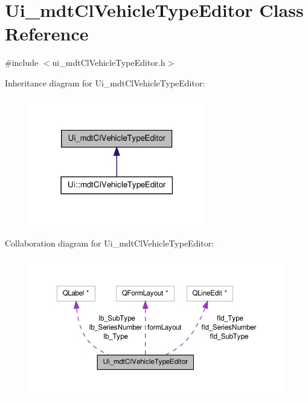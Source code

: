 \hypertarget{class_ui__mdt_cl_vehicle_type_editor}{\section{Ui\-\_\-mdt\-Cl\-Vehicle\-Type\-Editor Class Reference}
\label{class_ui__mdt_cl_vehicle_type_editor}
}


{\ttfamily \#include $<$ui\-\_\-mdt\-Cl\-Vehicle\-Type\-Editor.\-h$>$}



Inheritance diagram for Ui\-\_\-mdt\-Cl\-Vehicle\-Type\-Editor\-:
\nopagebreak
\begin{figure}[H]
\begin{center}
\leavevmode
\includegraphics[width=218pt]{class_ui__mdt_cl_vehicle_type_editor__inherit__graph}
\end{center}
\end{figure}


Collaboration diagram for Ui\-\_\-mdt\-Cl\-Vehicle\-Type\-Editor\-:
\nopagebreak
\begin{figure}[H]
\begin{center}
\leavevmode
\includegraphics[width=350pt]{class_ui__mdt_cl_vehicle_type_editor__coll__graph}
\end{center}
\end{figure}
